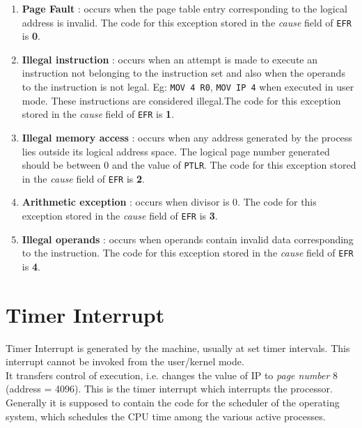 \documentclass[11pt]{report}
\begin{document}
\begin{enumerate}
\item \textbf{Page Fault} : occurs when the page table entry corresponding to the logical address is invalid. The code for this exception stored in the \textit{cause} field of \texttt{EFR} is \textbf{0}.

\item \textbf{Illegal instruction} : occurs when an attempt is made to execute an instruction not belonging to the instruction set and also when the operands to the instruction is not legal. Eg: \texttt{MOV 4 R0}, \texttt{MOV IP 4} when executed in user mode. These instructions are considered illegal.The code for this exception stored in the \textit{cause} field of \texttt{EFR} is \textbf{1}.

\item \textbf{Illegal memory access} : occurs when any address generated by the process lies outside its logical address space. The logical page number generated should be between 0 and the value of \texttt{PTLR}. The code for this exception stored in the \textit{cause} field of \texttt{EFR} is \textbf{2}.

\item \textbf{Arithmetic exception} : occurs when divisor is 0. The code for this exception stored in the \textit{cause} field of \texttt{EFR} is \textbf{3}.

\item \textbf{Illegal operands} : occurs when operands contain invalid data corresponding to the instruction. The code for this exception stored in the \textit{cause} field of \texttt{EFR} is \textbf{4}.



\end{enumerate}

\section{Timer Interrupt }
Timer Interrupt is generated by the machine, usually at set timer intervals. This interrupt cannot be invoked from the user/kernel mode.\\

It transfers control of execution, i.e. changes the value of IP to \textit{page number} 8 (address = 4096). This is the timer interrupt which interrupts the processor. Generally it is supposed to contain the code for the scheduler of the operating system, which schedules the CPU time among the various active processes.
\end{document}
